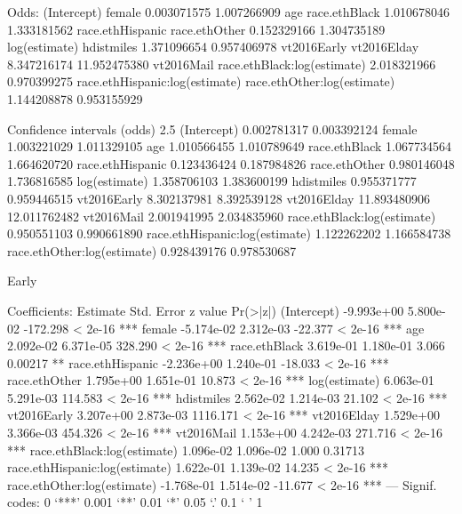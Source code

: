Odds:
(Intercept)                         female
                   0.003071575                    1.007266909
                           age                  race.ethBlack
                   1.010678046                    1.333181562
              race.ethHispanic                  race.ethOther
                   0.152329166                    1.304735189
                 log(estimate)                     hdistmiles
                   1.371096654                    0.957406978
                   vt2016Early                    vt2016Elday
                   8.347216174                   11.952475380
                    vt2016Mail    race.ethBlack:log(estimate)
                   2.018321966                    0.970399275
race.ethHispanic:log(estimate)    race.ethOther:log(estimate)
                   1.144208878                    0.953155929

Confidence intervals (odds)
2.5 %
(Intercept)                     0.002781317  0.003392124
female                          1.003221029  1.011329105
age                             1.010566455  1.010789649
race.ethBlack                   1.067734564  1.664620720
race.ethHispanic                0.123436424  0.187984826
race.ethOther                   0.980146048  1.736816585
log(estimate)                   1.358706103  1.383600199
hdistmiles                      0.955371777  0.959446515
vt2016Early                     8.302137981  8.392539128
vt2016Elday                    11.893480906 12.011762482
vt2016Mail                      2.001941995  2.034835960
race.ethBlack:log(estimate)     0.950551103  0.990661890
race.ethHispanic:log(estimate)  1.122262202  1.166584738
race.ethOther:log(estimate)     0.928439176  0.978530687



Early

Coefficients:
                                 Estimate Std. Error  z value Pr(>|z|)
(Intercept)                    -9.993e+00  5.800e-02 -172.298  < 2e-16 ***
female                         -5.174e-02  2.312e-03  -22.377  < 2e-16 ***
age                             2.092e-02  6.371e-05  328.290  < 2e-16 ***
race.ethBlack                   3.619e-01  1.180e-01    3.066  0.00217 **
race.ethHispanic               -2.236e+00  1.240e-01  -18.033  < 2e-16 ***
race.ethOther                   1.795e+00  1.651e-01   10.873  < 2e-16 ***
log(estimate)                   6.063e-01  5.291e-03  114.583  < 2e-16 ***
hdistmiles                      2.562e-02  1.214e-03   21.102  < 2e-16 ***
vt2016Early                     3.207e+00  2.873e-03 1116.171  < 2e-16 ***
vt2016Elday                     1.529e+00  3.366e-03  454.326  < 2e-16 ***
vt2016Mail                      1.153e+00  4.242e-03  271.716  < 2e-16 ***
race.ethBlack:log(estimate)     1.096e-02  1.096e-02    1.000  0.31713
race.ethHispanic:log(estimate)  1.622e-01  1.139e-02   14.235  < 2e-16 ***
race.ethOther:log(estimate)    -1.768e-01  1.514e-02  -11.677  < 2e-16 ***
---
Signif. codes:  0 ‘***’ 0.001 ‘**’ 0.01 ‘*’ 0.05 ‘.’ 0.1 ‘ ’ 1

